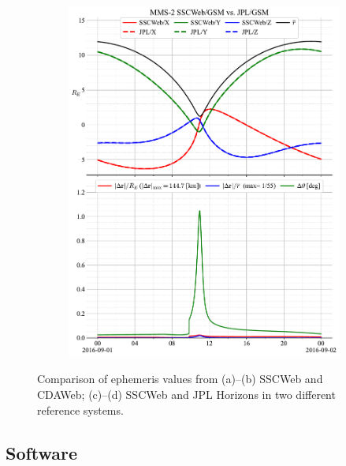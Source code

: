 \documentclass[draft]{agujournal2019}
\begin{document}
\begin{figure}[h]
\begin{subfigure}[b]{0.49\textwidth}
         \includegraphics[width=\textwidth]{code/figures/ephemeris/MMS-2_SSCWeb-GSM_vs_JPL-GSM.pdf}
     \end{subfigure}
     \caption{Comparison of ephemeris values from (a)--(b)  SSCWeb and CDAWeb; (c)--(d) SSCWeb and JPL Horizons in two different reference systems.}
     \label{fig:mms-2}
\end{figure}

\clearpage




\subsection{Software}
\label{sect:comparisons_software}
\end{document}
